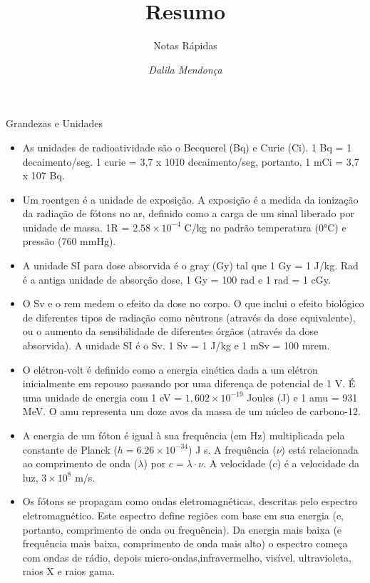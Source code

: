 \documentclass[11pt,a4paper]{article}
\title{Resumo}
\author{Notas Rápidas \nocite{*}}
\date{\textit{Dalila Mendonça}}
\newcounter{exemplo}
\begin{document}
	\maketitle




\begin{exemplo}

    \textcolor{CarnationPink}{Grandezas e Unidades}

    \begin{itemize}
        \item As unidades de radioatividade são o Becquerel (Bq) e Curie (Ci). 1 Bq = 1 decaimento/seg. 1 curie = 3,7 x 1010 decaimento/seg, portanto, 1 mCi = 3,7 x 107 Bq.
        
        \item Um roentgen é a unidade de exposição. A exposição é a medida da ionização da radiação de fótons no ar, definido como a carga de um sinal liberado por unidade de massa. 1R = $2.58 \times 10^{-4}$ C/kg no padrão temperatura (\ang{0}C) e pressão (760 mmHg).
        
        \item A unidade SI para dose absorvida é o gray (Gy) tal que 1 Gy = 1 J/kg. Rad é a antiga unidade de absorção
        dose, 1 Gy = 100 rad e 1 rad = 1 cGy.

        \item O Sv e o rem medem o efeito da dose no corpo. O que inclui o efeito biológico de diferentes tipos
        de radiação como nêutrons (através da dose equivalente), ou o aumento da sensibilidade de diferentes órgãos (através da dose absorvida). A unidade SI é o Sv. 1 Sv = 1 J/kg e 1 mSv = 100 mrem.

        \item O elétron-volt é definido como a energia cinética dada a um elétron inicialmente em repouso passando por
        uma diferença de potencial de 1 V. É uma unidade de energia com 1 eV = $1,602 \times 10^{-19}$ Joules (J) e
        1 amu = 931 MeV. O amu representa um doze avos da massa de um núcleo de carbono-12.

        \item A energia de um fóton é igual à sua frequência (em Hz) multiplicada pela constante de Planck ($h = 6.26 \times 10^{-34} $) J s. A frequência ($\nu$) está relacionada ao comprimento de onda ($\lambda$) por  $c = \lambda \cdot \nu$. A velocidade (c) é a velocidade da luz, $3 \times 10^{8}$ m/s.
        
        \item Os fótons se propagam como ondas eletromagnéticas, descritas pelo espectro eletromagnético. Este espectro define regiões com base em sua energia (e, portanto, comprimento de onda ou frequência). Da energia mais baixa (e frequência mais baixa, comprimento de onda mais alto) o espectro começa com ondas de rádio, depois micro-ondas,infravermelho, visível, ultravioleta, raios X e raios gama.


\end{itemize}
\end{exemplo}
\end{document}
